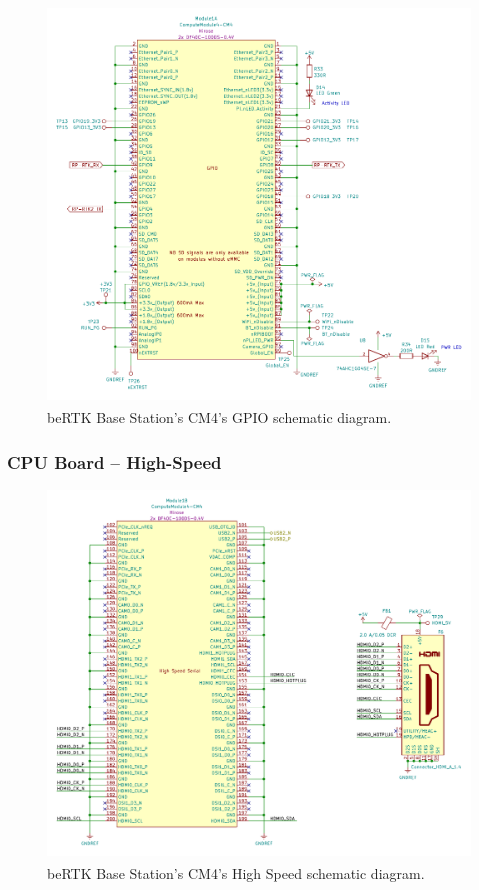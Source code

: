 \begin{figure}[h]
	\centering
	\includegraphics[width=1.0\textwidth]{Chapters/Figures/chapter3/CM4_GPIO.pdf}
	\caption{beRTK\textsuperscript{\textregistered} Base Station's CM4's GPIO schematic diagram.}
	\label{fig:CM4_GPIO_circuit}
\end{figure}

\subsubsection{CPU Board -- High-Speed}\label{sec:3222_CM4_HSpeed}

\begin{figure}[h]
	\centering
	\includegraphics[width=1.0\textwidth]{Chapters/Figures/chapter3/CM4_HighSpeed.pdf}
	\caption{beRTK\textsuperscript{\textregistered} Base Station's CM4's High Speed schematic diagram.}
	\label{fig:CM4_HighSpeed_circuit}
\end{figure}


